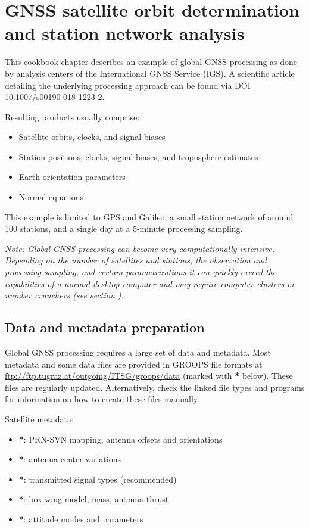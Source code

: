 \section{GNSS satellite orbit determination and station network analysis}\label{cookbook.gnssNetwork}

This cookbook chapter describes an example of global GNSS processing as done by analysis centers of the
International GNSS Service (IGS). A scientific article detailing the underlying processing approach
can be found via DOI \href{https://doi.org/10.1007/s00190-018-1223-2}{10.1007/s00190-018-1223-2}.

Resulting products usually comprise:
\begin{itemize}
  \item Satellite orbits, clocks, and signal biases
  \item Station positions, clocks, signal biases, and troposphere estimates
  \item Earth orientation parameters
  \item Normal equations
\end{itemize}

This example is limited to GPS and Galileo, a small station network of around 100 stations, and a single day at a 5-minute
processing sampling.

\emph{Note: Global GNSS processing can become very computationally intensive. Depending on the number of satellites
and stations, the observation and processing sampling, and certain parametrizations it can quickly exceed the capabilities
of a normal desktop computer and may require computer clusters or number crunchers (see section}
\emph{).}

\subsection{Data and metadata preparation}

Global GNSS processing requires a large set of data and metadata. Most metadata and some data files are
provided in GROOPS file formats at \url{ftp://ftp.tugraz.at/outgoing/ITSG/groops/data}
(marked with \textbf{*} below). These files are regularly updated. Alternatively, check the linked
file types and programs for information on how to create these files manually.

Satellite metadata:
\begin{itemize}
  \item {}\textbf{*}: PRN-SVN mapping, antenna offsets and orientations
  \item {}\textbf{*}: antenna center variations
  \item {}\textbf{*}: transmitted signal types (recommended)
  \item {}\textbf{*}: box-wing model, mass, antenna thrust
  \item {}\textbf{*}: attitude modes and parameters
\end{itemize}

